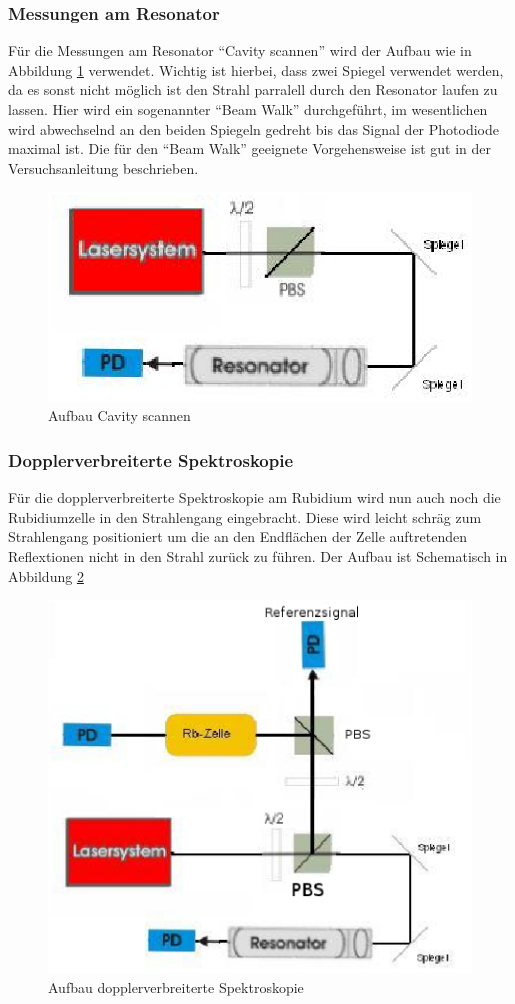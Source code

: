 \documentclass[12pt]{article}
\begin{document}
\subsubsection{Messungen am Resonator}
Für die Messungen am Resonator ``Cavity scannen'' wird der Aufbau wie in Abbildung \ref{skizze-cavity} verwendet. Wichtig ist hierbei, dass zwei Spiegel verwendet werden, da es sonst nicht möglich ist den Strahl parralell durch den Resonator laufen zu lassen. Hier wird ein sogenannter ``Beam Walk'' durchgeführt, im wesentlichen wird abwechselnd an den beiden Spiegeln gedreht bis das Signal der Photodiode maximal ist. Die für den ``Beam Walk'' geeignete Vorgehensweise ist gut in der Versuchsanleitung beschrieben.
\begin{figure}[H]
 \includegraphics[width=0.9\linewidth]{pictures/experiment_am_resonator.eps}
 \caption{Aufbau Cavity scannen}
 \label{skizze-cavity}
\end{figure}
\newpage
\subsubsection{Dopplerverbreiterte Spektroskopie}
Für die dopplerverbreiterte Spektroskopie am Rubidium wird nun auch noch die Rubidiumzelle in den Strahlengang eingebracht.
Diese wird leicht schräg zum Strahlengang positioniert um die an den Endflächen der Zelle auftretenden Reflextionen nicht in den Strahl zurück zu führen. Der Aufbau ist Schematisch in Abbildung \ref{skizze-dopplerbreit}
\begin{figure}[H]
 \includegraphics[width=0.9\linewidth]{pictures/aufbau_doppler.eps}
 \caption{Aufbau dopplerverbreiterte Spektroskopie}
 \label{skizze-dopplerbreit}
\end{figure}
\newpage
\end{document}
